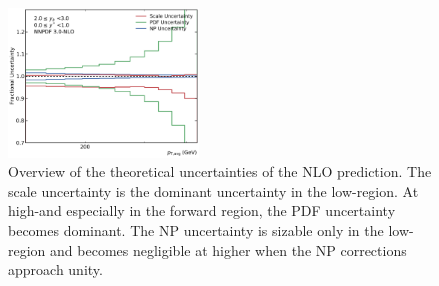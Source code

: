 \begin{figure}[htp]
    \includegraphics[width=0.45\textwidth]{figures/theory/theo_unc_yb2ys0.pdf}
    \caption[Overview of theoretical uncertaintites]{Overview of the theoretical uncertainties of the NLO prediction.
    The scale uncertainty is the dominant uncertainty in the low-\pt region. At
    high-\pt and especially in the forward region, the PDF uncertainty becomes
    dominant. The NP uncertainty is sizable only in the low-\pt region and becomes
    negligible at higher \pt when the NP corrections approach unity.}
    \label{fig:theo_uncertainties}
\end{figure}
